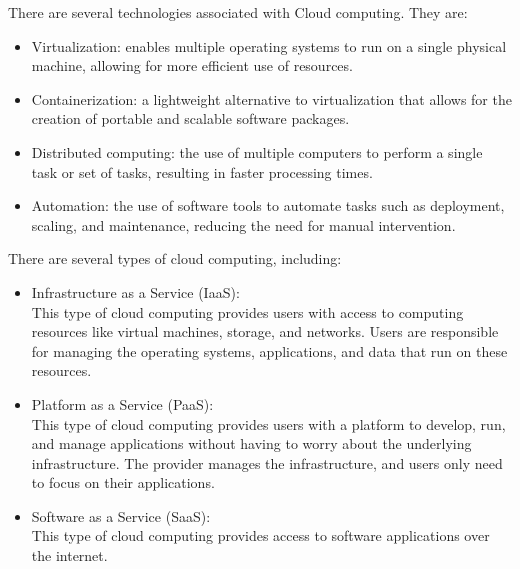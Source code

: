 \documentclass[12pt]{article}
\begin{document}
\begin{enumerate}
    There are several technologies associated with Cloud computing. They are:
    \begin{itemize}
        \item Virtualization: enables multiple operating systems to run on a single physical machine, allowing for more efficient use of resources.
        \item Containerization: a lightweight alternative to virtualization that allows for the creation of portable and scalable software packages.
        \item Distributed computing: the use of multiple computers to perform a single task or set of tasks, resulting in faster processing times.
        \item Automation: the use of software tools to automate tasks such as deployment, scaling, and maintenance, reducing the need for manual intervention.
    \end{itemize}
    
    There are several types of cloud computing, including:
    \begin{itemize}
        \item Infrastructure as a Service (IaaS):\\ This type of cloud computing provides users with access to computing resources like virtual machines, storage, and networks. Users are responsible for managing the operating systems, applications, and data that run on these resources.
        \item Platform as a Service (PaaS):\\ This type of cloud computing provides users with a platform to develop, run, and manage applications without having to worry about the underlying infrastructure. The provider manages the infrastructure, and users only need to focus on their applications.
        \item Software as a Service (SaaS):\\ This type of cloud computing provides access to software applications over the internet.
    \end{itemize}


\end{enumerate}
\end{document}
